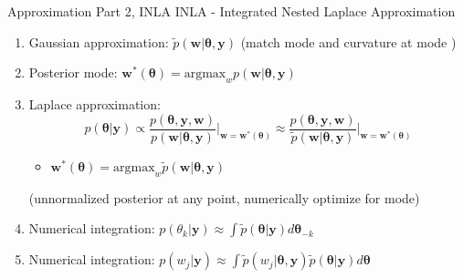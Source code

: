 \documentclass{beamer}
\begin{document}
\begin{frame}{Approximation Part 2, INLA}
INLA - Integrated Nested Laplace Approximation \citep{Rue2009} \\

        \begin{enumerate}
        \addtolength{\itemsep}{0.5\baselineskip}
        \item Gaussian approximation: $\tilde{p}(\pmb{w}|\pmb{\theta, y})$
        (match mode and curvature at mode \citep{Rue2005})
        \item Posterior mode: $\pmb{w}^{*}(\pmb{\theta}) = \text{argmax}_{w}p(\pmb{w}|\pmb{\theta, y})$
        \item Laplace approximation:
        $$ p(\pmb{\theta} | \pmb{y}) \propto \frac{p(\pmb{\theta, y, w})}{p(\pmb{w}|\pmb{\theta, y})} \Big|_{\pmb{w} = \pmb{w}^{*}(\pmb{\theta})} \approx \frac{p(\pmb{\theta, y, w})}{\tilde{p}(\pmb{w}|\pmb{\theta, y})} \Big|_{\pmb{w} = \pmb{w}^{*}(\pmb{\theta})}$$
        \begin{itemize}
        \item $\pmb{w}^{*}(\pmb{\theta}) = \text{argmax}_{w}\tilde{p}(\pmb{w}|\pmb{\theta, y})$
        \end{itemize}
        (unnormalized posterior at any point, numerically optimize for mode)
        \item Numerical integration:
        $ p(\theta_{k} | \pmb{y}) \approx \int \tilde{p}(\pmb{\theta}|\pmb{y}) d\pmb{\theta}_{-k} $
        \item Numerical integration:
        $ p(w_{j} | \pmb{y}) \approx \int \tilde{p}(w_{j}|\pmb{\theta, y})\tilde{p}(\pmb{\theta}|\pmb{y}) d\pmb{\theta} $
        \end{enumerate}
\end{frame}
% 
% 
\end{document}
